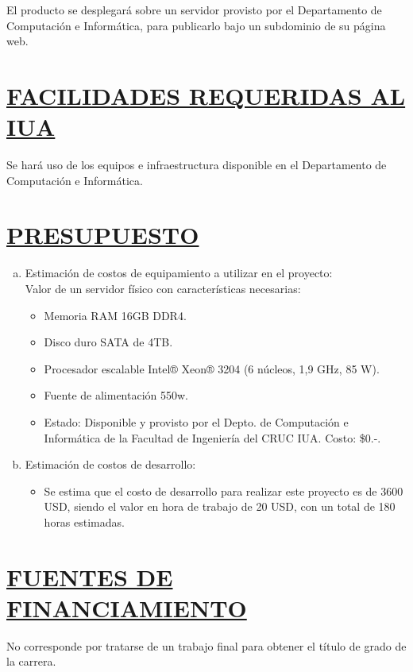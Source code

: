 El producto se desplegará sobre un servidor provisto por el Departamento de Computación e Informática, para publicarlo bajo un subdominio de su página web.

\section*{\underline{FACILIDADES REQUERIDAS AL IUA}}
Se hará uso de los equipos e infraestructura disponible en el Departamento de Computación e Informática.


\section*{\underline{PRESUPUESTO}}
\begin{enumerate}[(a)]
	\item Estimación de costos de equipamiento a utilizar en el proyecto:\\
Valor de un servidor físico con características necesarias:

		\begin{itemize}
			\item Memoria RAM 16GB DDR4.
			\item Disco duro SATA de 4TB.
			\item Procesador escalable Intel® Xeon® 3204 (6 núcleos, 1,9 GHz, 85 W).
			\item Fuente de alimentación 550w.
			\item Estado: Disponible y provisto por el Depto. de Computación e Informática de la Facultad de Ingeniería del CRUC IUA. Costo: \$0.-.
		\end{itemize}

	\item Estimación de costos de desarrollo:
		\begin{itemize}
			\item Se estima que el costo de desarrollo para realizar este proyecto es de 3600 USD, siendo el valor en hora de trabajo de 20 USD, con un total de 180 horas estimadas.
		\end{itemize}
\end{enumerate}

\section*{\underline{FUENTES DE FINANCIAMIENTO}}
No corresponde por tratarse de un trabajo final para obtener el título de grado de la carrera.


